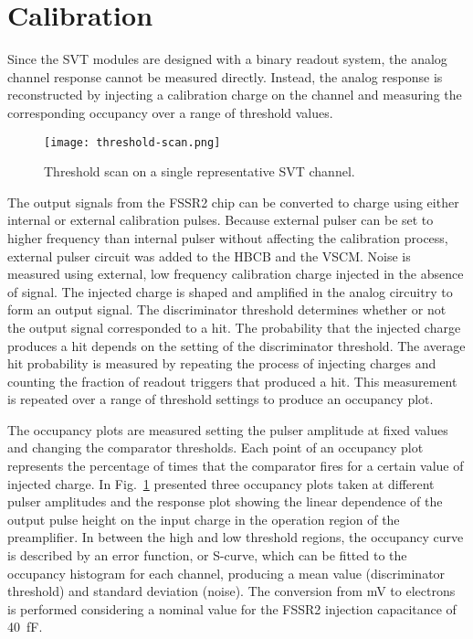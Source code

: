 \section{Calibration}

Since the SVT modules are designed with a binary readout system, the analog channel response cannot be measured directly. Instead, the analog response is reconstructed by injecting a calibration charge on the channel and measuring the corresponding occupancy over a range of threshold values. 

\begin{figure}[hbt] 
	\centering 
	\texttt{[image: threshold-scan.png]}
	\caption{Threshold scan on a single representative SVT channel.}
	\label{fig:threshold-scan}
\end{figure}

The output signals from the FSSR2 chip can be converted to charge using either internal or external calibration pulses. Because external pulser can be set to higher frequency than internal pulser without affecting the calibration process, external pulser circuit was added to the HBCB and the VSCM. Noise is measured using external, low frequency calibration charge injected in the absence of signal. The injected charge is shaped and amplified in the analog circuitry to form an output signal. The discriminator threshold determines whether or not the output signal corresponded to a hit. The probability that the injected charge produces a hit depends on the setting of the discriminator threshold. The average hit probability is measured by repeating the process of injecting charges and counting the fraction of readout triggers that produced a hit. This measurement is repeated over a range of threshold settings to produce an occupancy plot. 

The occupancy plots are measured setting the pulser amplitude at fixed values and changing the comparator thresholds. Each point of an occupancy plot represents the percentage of times that the comparator fires for a certain value of injected charge. In Fig.~\ref{fig:threshold-scan} presented three occupancy plots taken at different pulser amplitudes and the response plot showing the linear dependence of the output pulse height on the input charge in the operation region of the preamplifier. In between the high and low threshold regions, the occupancy curve is described by an error function, or S-curve, which can be fitted to the occupancy histogram for each channel, producing a mean value (discriminator threshold) and standard deviation (noise). The conversion from mV to electrons is performed considering a nominal value for the FSSR2 injection capacitance of 40~fF. 

